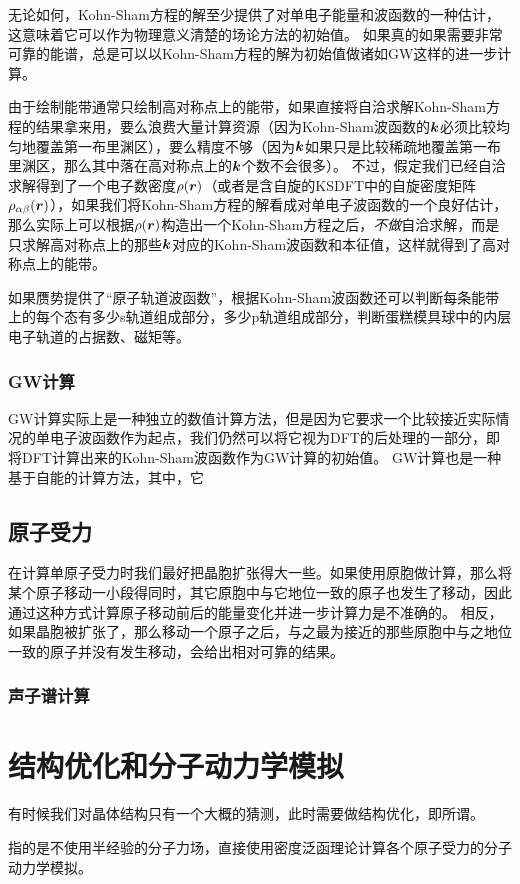无论如何，Kohn-Sham方程的解至少提供了对单电子能量和波函数的一种估计，这意味着它可以作为物理意义清楚的场论方法的初始值。
如果真的如果需要非常可靠的能谱，总是可以以Kohn-Sham方程的解为初始值做诸如GW这样的进一步计算。

由于绘制能带通常只绘制高对称点上的能带，如果直接将自洽求解Kohn-Sham方程的结果拿来用，要么浪费大量计算资源（因为Kohn-Sham波函数的$\vb*{k}$必须比较均匀地覆盖第一布里渊区），要么精度不够（因为$\vb*{k}$如果只是比较稀疏地覆盖第一布里渊区，那么其中落在高对称点上的$\vb*{k}$个数不会很多）。
不过，假定我们已经自洽求解得到了一个电子数密度$\rho(\vb*{r})$（或者是含自旋的KSDFT中的自旋密度矩阵$\rho_{\alpha \beta}(\vb*{r})$），如果我们将Kohn-Sham方程的解看成对单电子波函数的一个良好估计，那么实际上可以根据$\rho(\vb*{r})$构造出一个Kohn-Sham方程之后，\emph{不做}自洽求解，而是只求解高对称点上的那些$\vb*{k}$对应的Kohn-Sham波函数和本征值，这样就得到了高对称点上的能带。

如果赝势提供了“原子轨道波函数”，根据Kohn-Sham波函数还可以判断每条能带上的每个态有多少s轨道组成部分，多少p轨道组成部分，判断蛋糕模具球中的内层电子轨道的占据数、磁矩等。

\subsubsection{GW计算}

GW计算实际上是一种独立的数值计算方法，但是因为它要求一个比较接近实际情况的单电子波函数作为起点，我们仍然可以将它视为DFT的后处理的一部分，即将DFT计算出来的Kohn-Sham波函数作为GW计算的初始值。
GW计算也是一种基于自能的计算方法，其中，它

\subsection{原子受力}

在计算单原子受力时我们最好把晶胞扩张得大一些。如果使用原胞做计算，那么将某个原子移动一小段得同时，其它原胞中与它地位一致的原子也发生了移动，因此通过这种方式计算原子移动前后的能量变化并进一步计算力是不准确的。
相反，如果晶胞被扩张了，那么移动一个原子之后，与之最为接近的那些原胞中与之地位一致的原子并没有发生移动，会给出相对可靠的结果。

\subsubsection{声子谱计算}

\section{结构优化和分子动力学模拟}\label{sec:structural-relaxation-md}

有时候我们对晶体结构只有一个大概的猜测，此时需要做结构优化，即所谓。

指的是不使用半经验的分子力场，直接使用密度泛函理论计算各个原子受力的分子动力学模拟。
